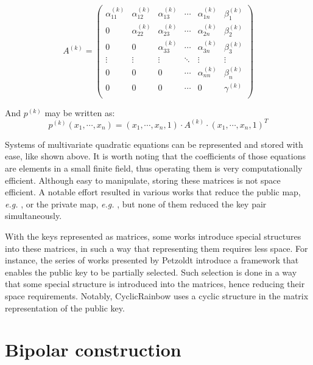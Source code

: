 \documentclass{ufsctex/ufsctex}
\begin{document}
\begin{equation}
A^{(k)} =
\begin{pmatrix}
\alpha^{(k)}_{11} & \alpha^{(k)}_{12} & \alpha^{(k)}_{13} & \cdots &
	\alpha^{(k)}_{1n} & \beta^{(k)}_1 \\
0 & \alpha^{(k)}_{22} & \alpha^{(k)}_{23} & \cdots &
	\alpha^{(k)}_{2n} & \beta^{(k)}_2 \\
0 & 0 & \alpha^{(k)}_{33} & \cdots &
	\alpha^{(k)}_{3n} & \beta^{(k)}_3 \\
\vdots & \vdots & \vdots & \ddots & \vdots & \vdots \\
0 & 0 & 0 & \cdots & \alpha^{(k)}_{nn} & \beta^{(k)}_n \\
0 & 0 & 0 & \cdots & 0 & \gamma^{(k)} \\
\end{pmatrix}
\end{equation}

And $p^{(k)}$ may be written as:
\begin{equation}
p^{(k)}(x_1,\cdots,x_n) =
	(x_1,\cdots,x_n,1) \cdot A^{(k)} \cdot (x_1,\cdots,x_n,1)^T
\end{equation}

Systems of multivariate quadratic equations can be represented and stored with
ease, like shown above. It is worth noting that the coefficients of those
equations are elements in a small finite field, thus operating them is very
computationally efficient. Although easy to manipulate, storing these matrices
is not space efficient. A notable effort resulted in various works that reduce
the public map, \textit{e.g.} \cite{petzoldt2010cyclicrainbow}, or the private
map, \textit{e.g.} \cite{yasuda2012reducing}, but none of them reduced the key
pair simultaneously.

With the keys represented as matrices, some works introduce special structures
into these matrices, in such a way that representing them requires less space.
For instance, the series of works presented by Petzoldt introduce a framework
that enables the public key to be partially selected. Such selection is done in
a way that some special structure is introduced into the matrices, hence
reducing their space requirements. Notably, CyclicRainbow uses a cyclic
structure in the matrix representation of the public key.

\section{Bipolar construction}\label{sec:bipolar}
\end{document}
